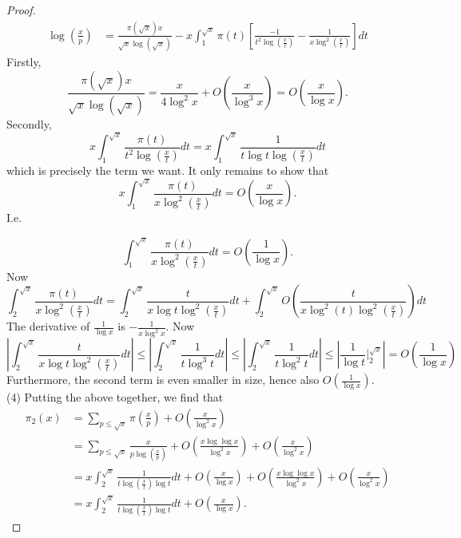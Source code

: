 \documentclass[reqno]{amsart}
\theoremstyle{definition}
\theoremstyle{remark}
\begin{document}
\begin{proof}
\begin{align*}
{        \log \left( \frac{x}{p} \right) }
        &= \frac{\pi\left( \sqrt{x}  \right) x}{\sqrt{x} 
        \log \left( \sqrt{x}  \right) }
        - x \int_{1}^{\sqrt{x} } 
        \pi(t) 
        \left[ \frac{- 1 }{t^2 \log\left( \frac{x}{t} \right) }
        - \frac{1}{x \log^2 \left( \frac{x}{t} \right) }\right] dt
    \end{align*}
    Firstly,
    \[
    \frac{\pi\left( \sqrt{x}  \right) x}{\sqrt{x} 
    \log \left( \sqrt{x}  \right) }
    = \frac{x}{4 \log^2 x}
    + O\left( \frac{x}{\log^3 x} \right) 
    = O \left( \frac{x}{\log x} \right) .
    \] 
    Secondly,
    \[
    x \int_{1}^{\sqrt{x} } 
    \frac{\pi(t)}{t^2 \log\left( \frac{x}{t} \right) } dt
    = x
\int_{1}^{\sqrt{x} } \frac{1}{
    t \log t \log \left( \frac{x}{t} \right) } dt
    \] 
    which is precisely the term we want. 
    It only remains to show that
    \[
    x \int_{1}^{\sqrt{x} } \frac{\pi(t)}{x
    \log^2 \left( \frac{x}{t} \right) } dt
    = O\left( \frac{x}{\log x} \right) .
    \] 
    I.e.
    
    \[
     \int_{1}^{\sqrt{x} } \frac{\pi(t)}{x
    \log^2 \left( \frac{x}{t} \right) } dt
    = O\left( \frac{1}{\log x} \right) .
    \] 
    Now
    \[
    \int_{2}^{\sqrt{x} } 
    \frac{\pi(t)}{x \log^2 \left( \frac{x}{t} \right) }
    dt = 
    \int_{2}^{\sqrt{x} } \frac{t}{x \log t
    \log^2 \left( \frac{x}{t} \right) } dt
    + \int_{2}^{\sqrt{x} } 
    O\left( \frac{t}{x \log^2 (t) \log^2
    \left( \frac{x}{t} \right) } \right) dt
    \] 
    The derivative of
    $\frac{1}{\log x}$ is
    $- \frac{1}{x \log^2 x}$.
    Now
    \[
    \left| \int_{2}^{\sqrt{x} } \frac{t}{x
    \log t \log^2 \left( \frac{x}{t} \right) }
    dt \right|
    \le 
    \left| \int_{2}^{\sqrt{x} } 
    \frac{1}{t \log^3 t}dt \right|
    \le 
    \left| \int_{2}^{\sqrt{x} } 
    \frac{1}{t \log^2 t} dt\right| 
    \le \left| \frac{1}{\log t} \bigg|_{2}^{\sqrt{x} }  \right| 
    = O \left( \frac{1}{\log x} \right) 
    \] 
    Furthermore, the
    second term is even
    smaller in size, hence
    also $O \left( \frac{1}{\log x} \right) $.\\
    \linebreak
    (4) Putting the above together, we find that
    \begin{align*}
        \pi_2(x) 
        &= \sum_{p \le \sqrt{x} } \pi\left( \frac{x}{p} \right) 
        + O \left( \frac{x}{\log^2 x} \right) \\
        &=
        \sum_{p\le \sqrt{x} } \frac{x}{p \log\left( 
        \frac{x}{p} \right) } +
        O\left( \frac{x \log \log x}{\log^2 x} \right) 
        + O \left( \frac{x}{\log^2 x} \right) \\
        &= x \int_{2}^{\sqrt{x} } 
        \frac{1}{t \log \left( \frac{x}{t} \right) \log t}dt
        + O \left( \frac{x}{\log x} \right) 
        + O \left( \frac{x \log \log x}{\log^2 x} \right) 
        + O \left( \frac{x}{\log^2 x} \right)\\
        &= x \int_{2}^{\sqrt{x} } \frac{1}{t \log \left( \frac{x}{t}
        \right) \log t} dt + O \left( \frac{x}{\log x} \right) . 
    \end{align*}


\end{proof}
\end{document}
